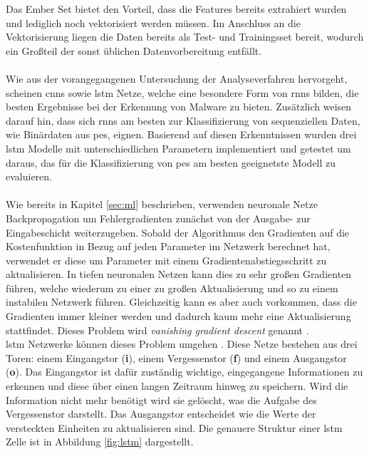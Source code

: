 \documentclass[
    12pt, %
    DIV10,
    ngerman, %
    a4paper, %
    oneside, %
    titlepage, %
    parskip=half, %
    headings=normal, %
    listof=totoc, %
    bibliography=totoc, %
    index=totoc, %
    captions=tableheading, %
    final %
]{scrreprt}
\begin{document}
Das Ember Set bietet den Vorteil, dass die Features bereits extrahiert wurden und lediglich noch vektorisiert werden müssen. Im Anschluss an die Vektorisierung liegen die Daten bereits als Test- und Trainingsset bereit, wodurch ein Gro{\ss}teil der sonst üblichen Datenvorbereitung entfällt.\\\\
Wie aus der vorangegangenen Untersuchung der Analyseverfahren hervorgeht, scheinen \ac{cnns} sowie \ac{lstm} Netze, welche eine besondere Form von \ac{rnns} bilden, die besten Ergebnisse bei der Erkennung von Malware zu bieten. Zusätzlich weisen \textcite{JoshuaSaxe2018} darauf hin, dass sich \ac{rnns} am besten zur Klassifizierung von sequenziellen Daten, wie Binärdaten aus \ac{pes}, eignen. Basierend auf diesen Erkenntnissen wurden drei \ac{lstm} Modelle mit unterschiedlichen Parametern implementiert und getestet um daraus, das für die Klassifizierung von \ac{pes} am besten geeignetste Modell zu evaluieren.\\\\
Wie bereits in Kapitel \ref{sec:ml} beschrieben, verwenden neuronale Netze Backpropagation um Fehlergradienten zunächst von der Ausgabe- zur Eingabeschicht weiterzugeben. Sobald der Algorithmus den Gradienten auf die Kostenfunktion in Bezug auf jeden Parameter im Netzwerk berechnet hat, verwendet er diese um Parameter mit einem Gradientenabstiegsschritt zu aktualisieren. In tiefen neuronalen Netzen kann dies zu sehr gro{\ss}en Gradienten führen, welche wiederum zu einer zu gro{\ss}en Aktualisierung und so zu einem instabilen Netzwerk führen. Gleichzeitig kann es aber auch vorkommen, dass die Gradienten immer kleiner werden und dadurch kaum mehr eine Aktualisierung stattfindet. Dieses Problem wird \emph{vanishing gradient descent} genannt \parencite{geron2019hands}.\\
\ac{lstm} Netzwerke können dieses Problem umgehen \parencite{hochreiter1997long}. Diese Netze bestehen aus drei Toren: einem Eingangstor (\textbf{i}), einem Vergessenstor (\textbf{f}) und einem Ausgangstor (\textbf{o}). Das Eingangstor ist dafür zuständig wichtige, eingegangene Informationen zu erkennen und diese über einen langen Zeitraum hinweg zu speichern. Wird die Information nicht mehr benötigt wird sie gelöscht, was die Aufgabe des Vergessenstor darstellt. Das Ausgangstor entscheidet wie die Werte der versteckten Einheiten zu aktualisieren sind. Die genauere Struktur einer \ac{lstm} Zelle ist in Abbildung \ref{fig:lstm} dargestellt.
\end{document}
